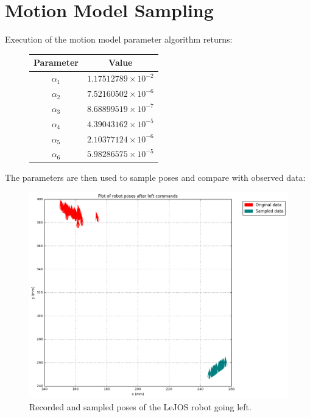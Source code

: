 \documentclass[paper=a4, fontsize=11pt]{scrartcl} %
\title{\hmwkClass \\
       \hmwkTitle}
\author{\hmwkAuthorFullName}
\date{\hmwkDueDate}
\begin{document}
    \maketitle
    \thispagestyle{fancy} %
    
    \section{Motion Model Sampling}
    Execution of the motion model parameter algorithm returns:
    \begin{figure}[h!]
        \centering
        \def\arraystretch{1.5}
        \begin{tabular}{|c|c|}
            \hline
            Parameter & Value \\
            \hline
            $\alpha_1$ & $1.17512789\times 10 ^{-2}$ \\
            $\alpha_2$ & $7.52160502\times 10 ^{-6}$ \\
            $\alpha_3$ & $8.68899519\times 10 ^{-7}$ \\
            $\alpha_4$ & $4.39043162\times 10 ^{-5}$ \\
            $\alpha_5$ & $2.10377124\times 10 ^{-6}$ \\
            $\alpha_6$ & $5.98286575\times 10 ^{-5}$ \\
            \hline
        \end{tabular}
    \end{figure}

    The parameters are then used to sample poses and compare with observed data:

    \begin{figure}[h!]
        \begin{center}
            \setlength{\fboxsep}{0.5pt} %
            \setlength{\fboxrule}{0.5pt}
            \includegraphics[width=13.5cm,fbox]{images/sampled_poses_left.png}
            \caption{Recorded and sampled poses of the LeJOS robot going left.}
        \end{center}
    \end{figure}
\end{document}
